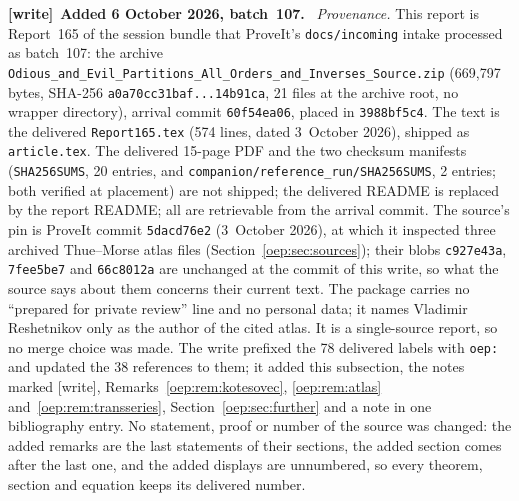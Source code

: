 \documentclass[11pt,letterpaper]{article}
\theoremstyle{remark}\newtheorem{remark}[theorem]{Remark}
\newcommand{\file}[1]{\nolinkurl{#1}}
\newenvironment{writenote}[1][]{\par\smallskip\begingroup\small
 \noindent\textbf{[write]}\if\relax\detokenize{#1}\relax\else~\textbf{#1.}\fi\ }%
 {\par\endgroup\smallskip}
\begin{document}
\begin{writenote}[Added 6 October 2026, batch~107]
\emph{Provenance.} This report is Report~165 of the session bundle that
ProveIt's \file{docs/incoming} intake processed as batch~107: the archive
\file{Odious_and_Evil_Partitions_All_Orders_and_Inverses_Source.zip}
(669{,}797 bytes, SHA-256 \file{a0a70cc31baf...14b91ca}, 21 files at the
archive root, no wrapper directory), arrival commit \file{60f54ea06}, placed
in \file{3988bf5c4}. The text is the delivered \file{Report165.tex} (574
lines, dated 3~October 2026), shipped as \file{article.tex}. The delivered
15-page PDF and the two checksum manifests (\file{SHA256SUMS}, 20 entries,
and \file{companion/reference_run/SHA256SUMS}, 2 entries; both verified at
placement) are not shipped; the delivered README is replaced by the report
README; all are retrievable from the arrival commit. The source's pin is
ProveIt commit \file{5dacd76e2} (3~October 2026), at which it inspected three
archived Thue--Morse atlas files (Section~\ref{oep:sec:sources}); their blobs
\file{c927e43a}, \file{7fee5be7} and \file{66c8012a} are unchanged at the
commit of this write, so what the source says about them concerns their
current text. The package carries no ``prepared for private review'' line
and no personal data; it names Vladimir Reshetnikov only as the author of
the cited atlas. It is a single-source report, so no merge choice was made.
The write prefixed the 78 delivered labels with \file{oep:} and updated the
38 references to them; it added this subsection, the notes marked [write],
Remarks~\ref{oep:rem:kotesovec}, \ref{oep:rem:atlas}
and~\ref{oep:rem:transseries}, Section~\ref{oep:sec:further} and a note in
one bibliography entry. No statement, proof or number of the source was
changed: the added remarks are the last statements of their sections, the
added section comes after the last one, and the added displays are
unnumbered, so every theorem, section and equation keeps its delivered
number.


\end{writenote}
\end{document}
